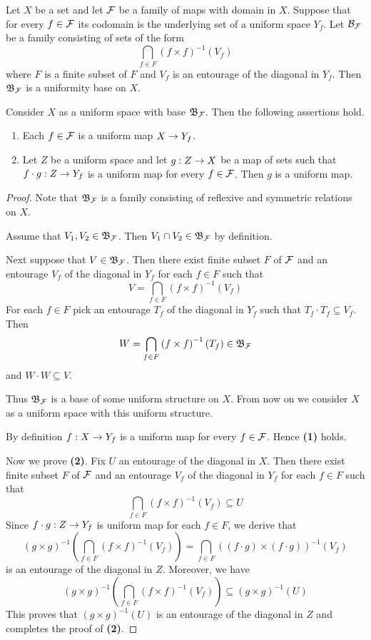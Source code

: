 \documentclass[10pt]{amsart}
\begin{document}
\begin{theorem}\label{theorem:uniformity_induced_by_family_of_maps}
	Let $X$ be a set and let ${\mathcal F}$ be a family of maps with domain in $X$. Suppose that for every $f \in {\mathcal F}$ its codomain is the underlying set of a uniform space $Y_f$. Let ${\mathcal B}_{{\mathcal F}}$ be a family consisting of sets of the form
	$$\bigcap_{f\in F}\left(f\times f\right)^{-1}(V_f)$$
	where $F$ is a finite subset of $F$ and $V_f$ is an entourage of the diagonal in $Y_f$. Then ${\mathfrak B}_{{\mathcal F}}$ is a uniformity base on $X$.

	Consider $X$ as a uniform space with base ${\mathfrak B}_{{\mathcal F}}$. Then the following assertions hold.
	\begin{enumerate}[label=\emph{\textbf{(\arabic*)}}, leftmargin=3.0em]
		\item Each $f \in {\mathcal F}$ is a uniform map $X \rightarrow Y_f$.
		\item Let $Z$ be a uniform space and let $g:Z\rightarrow X$ be a map of sets such that $f\cdot g:Z\rightarrow Y_f$ is a uniform map for every $f\in {\mathcal F}$. Then $g$ is a uniform map.
	\end{enumerate}
\end{theorem}
\begin{proof}
	Note that ${\mathfrak B}_{{\mathcal F}}$ is a family consisting of reflexive and symmetric relations on $X$. 

	Assume that $V_1,V_2 \in {\mathfrak B}_{{\mathcal F}}$. Then $V_1\cap V_2 \in {\mathfrak B}_{\mathcal F}$ by definition.

	Next suppose that $V \in {\mathfrak B}_{{\mathcal F}}$. Then there exist finite subset $F$ of ${\mathcal F}$ and an entourage $V_f$ of the diagonal in $Y_f$ for each $f\in F$ such that
	$$V = \bigcap_{f\in F}\left(f\times f\right)^{-1}(V_f)$$
	For each $f \in F$ pick an entourage $T_f$ of the diagonal in $Y_f$ such that $T_f\cdot T_f \subseteq V_f$. Then
	$$W = \bigcap_{f \in F}\left(f\times f\right)^{-1}(T_f) \in {\mathfrak B}_{{\mathcal F}}$$
	and $W\cdot W \subseteq V$.

	Thus ${\mathfrak B}_{{\mathcal F}}$ is a base of some uniform structure on $X$. From now on we consider $X$ as a uniform space with this uniform structure.

	By definition $f:X\rightarrow Y_f$ is a uniform map for every $f\in {\mathcal F}$. Hence \textbf{(1)} holds.

	Now we prove \textbf{(2)}. Fix $U$ an entourage of the diagonal in $X$. Then there exist finite subset $F$ of ${\mathcal F}$ and an entourage $V_f$ of the diagonal in $Y_f$ for each $f\in F$ such that
	$$\bigcap_{f\in F}\left(f\times f\right)^{-1}(V_f) \subseteq U$$
	Since $f\cdot g:Z\rightarrow Y_f$ is uniform map for each $f \in F$, we derive that
	$$\left(g\times g\right)^{-1}\left(\bigcap_{f\in F}\left(f\times f\right)^{-1}\left(V_f\right)\right) = \bigcap_{f\in F}\left((f\cdot g)\times (f\cdot g)\right)^{-1}(V_f)$$
	is an entourage of the diagonal in $Z$. Moreover, we have
	$$\left(g\times g\right)^{-1}\left(\bigcap_{f\in F}\left(f\times f\right)^{-1}\left(V_f\right)\right) \subseteq \left(g\times g\right)^{-1}(U)$$
	This proves that $(g\times g)^{-1}(U)$ is an entourage of the diagonal in $Z$ and completes the proof of \textbf{(2)}.
\end{proof}
\end{document}
